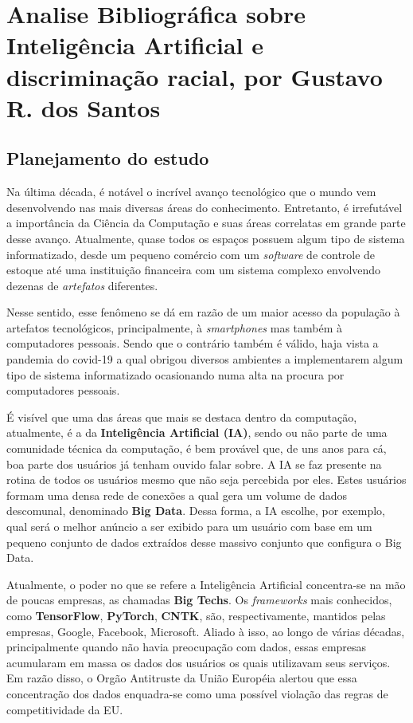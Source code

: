 \chapter{Analise Bibliográfica sobre Inteligência Artificial e discriminação racial, por Gustavo R. dos Santos\label{chap:bibliometria:gutorsantos}}

\section{Planejamento do estudo}

Na última década, é notável o incrível avanço tecnológico que o mundo vem desenvolvendo nas mais diversas áreas do conhecimento. Entretanto, é irrefutável a importância da Ciência da Computação e suas áreas correlatas em grande parte desse avanço. Atualmente, quase todos os espaços possuem algum tipo de sistema informatizado, desde um pequeno comércio com um \textit{software} de controle de estoque até uma instituição financeira com um sistema complexo envolvendo dezenas de \textit{artefatos} diferentes. 

Nesse sentido, esse fenômeno se dá em razão de um maior acesso da população à artefatos tecnológicos, principalmente, à \textit{smartphones} mas também à computadores pessoais. Sendo que o contrário também é válido, haja vista a pandemia do covid-19 a qual obrigou diversos ambientes a implementarem algum tipo de sistema informatizado ocasionando numa alta na procura por computadores pessoais. 

É visível que uma das áreas que mais se destaca dentro da computação, atualmente, é a da \textbf{Inteligência Artificial (IA)}, sendo ou não parte de uma comunidade técnica da computação, é bem provável que, de uns anos para cá, boa parte dos usuários já tenham ouvido falar sobre. A IA se faz presente na rotina de todos os usuários mesmo que não seja percebida por eles. Estes usuários formam uma densa rede de conexões a qual gera um volume de dados descomunal, denominado \textbf{Big Data}. Dessa forma, a IA escolhe, por exemplo, qual será o melhor anúncio a ser exibido para um usuário com base em um pequeno conjunto de dados extraídos desse massivo conjunto que configura o Big Data.

Atualmente, o poder no que se refere a Inteligência Artificial concentra-se na mão de poucas empresas, as chamadas \textbf{Big Techs}. Os \textit{frameworks} mais conhecidos, como \textbf{TensorFlow}, \textbf{PyTorch}, \textbf{CNTK}, são, respectivamente, mantidos pelas empresas, Google, Facebook, Microsoft. Aliado à isso, ao longo de várias décadas, principalmente quando não havia preocupação com dados, essas empresas acumularam em massa os dados dos usuários os quais utilizavam seus serviços. Em razão disso, o Orgão Antitruste da União Européia alertou que essa concentração dos dados enquadra-se como uma possível violação das regras de competitividade da EU.


